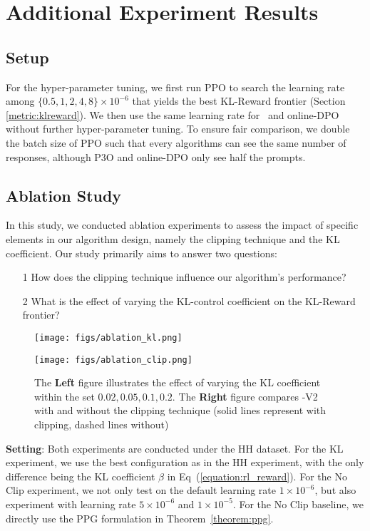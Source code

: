 \documentclass{article} %
\newcommand{\algn}{\text{P3O}}
\begin{document}
\section{Additional Experiment Results}
\label{appendix:additional}
\subsection{Setup}
For the hyper-parameter tuning, we first run PPO to search the learning rate among $\{0.5,1,2,4,8\}\times 10^{-6}$ that yields the best KL-Reward frontier (Section \ref{metric:klreward}). We then use the same learning rate for \algn\ and online-DPO without further hyper-parameter tuning. To ensure fair comparison, we double the batch size of PPO such that every algorithms can see the same number of responses,
although P3O and online-DPO only see half the prompts.
\subsection{Ablation Study}
In this study, we conducted ablation experiments to assess the impact of specific elements in our algorithm design, namely the clipping technique and the KL coefficient. Our study primarily aims to answer two questions:
\begin{itemize}
    \item[1] How does the clipping technique influence our algorithm's performance?
    \item[2] What is the effect of varying the KL-control coefficient on the KL-Reward frontier?
\end{itemize}
\begin{figure}[th]
  \centering
  \begin{minipage}[b]{0.52\textwidth}
    \texttt{[image: figs/ablation\_kl.png]}
  \end{minipage}\hspace{-20pt}
  \begin{minipage}[b]{0.52\textwidth}
    \texttt{[image: figs/ablation\_clip.png]}
  \end{minipage}
  \caption{The \textbf{Left} figure illustrates the effect of varying the KL coefficient within the set ${0.02,0.05,0.1,0.2}$. The \textbf{Right} figure compares \algn-V2 with and without the clipping technique (solid lines represent with clipping, dashed lines without)}
  \label{figure:ablation}
\end{figure}
\textbf{Setting}: Both experiments are conducted under the HH dataset. For the KL experiment, we use the best configuration as in the HH experiment, with the only difference being the KL coefficient $\beta$ in Eq~(\ref{equation:rl_reward}). For the No Clip experiment, we not only test on the default learning rate $1 \times 10^{-6}$, but also experiment with learning rate $5\times 10^{-6}$ and $1\times 10^{-5}$. For the No Clip baseline, we directly use the PPG formulation in Theorem~\ref{theorem:ppg}.
\end{document}

